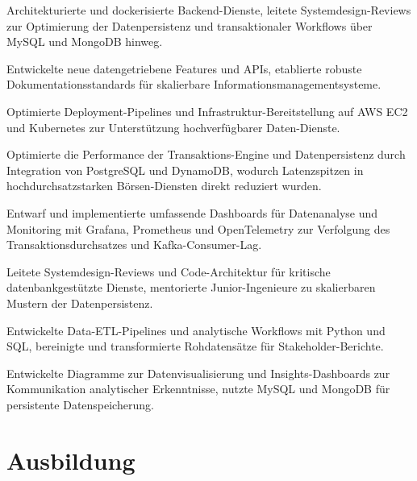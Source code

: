 \documentclass[10pt,a4paper]{resume}
\begin{document}
\bullets
  \item Architekturierte und dockerisierte Backend-Dienste, leitete Systemdesign-Reviews zur Optimierung der Datenpersistenz und transaktionaler Workflows über MySQL und MongoDB hinweg.
  \item Entwickelte neue datengetriebene Features und APIs, etablierte robuste Dokumentationsstandards für skalierbare Informationsmanagementsysteme.
  \item Optimierte Deployment-Pipelines und Infrastruktur-Bereitstellung auf AWS EC2 und Kubernetes zur Unterstützung hochverfügbarer Daten-Dienste.
\bulletsend
\vspace{1.5pt}
\bullets
  \item Optimierte die Performance der Transaktions-Engine und Datenpersistenz durch Integration von PostgreSQL und DynamoDB, wodurch Latenzspitzen in hochdurchsatzstarken Börsen-Diensten direkt reduziert wurden.
  \item Entwarf und implementierte umfassende Dashboards für Datenanalyse und Monitoring mit Grafana, Prometheus und OpenTelemetry zur Verfolgung des Transaktionsdurchsatzes und Kafka-Consumer-Lag.
  \item Leitete Systemdesign-Reviews und Code-Architektur für kritische datenbankgestützte Dienste, mentorierte Junior-Ingenieure zu skalierbaren Mustern der Datenpersistenz.
\bulletsend
\vspace{1.5pt}
\bullets
  \item Entwickelte Data-ETL-Pipelines und analytische Workflows mit Python und SQL, bereinigte und transformierte Rohdatensätze für Stakeholder-Berichte.
  \item Entwickelte Diagramme zur Datenvisualisierung und Insights-Dashboards zur Kommunikation analytischer Erkenntnisse, nutzte MySQL und MongoDB für persistente Datenspeicherung.
\bulletsend
\vspace{1.5pt}

\section{Ausbildung}

\vspace{2pt}
\end{document}
